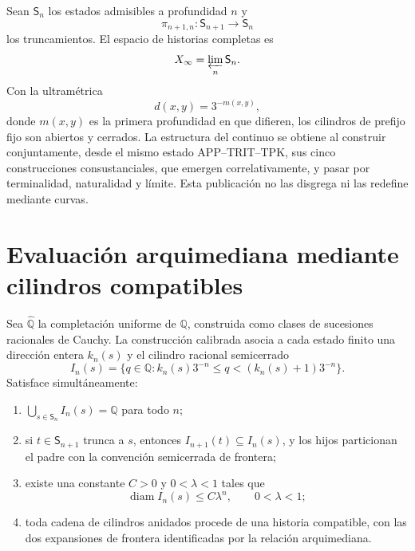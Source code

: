 Sean \(\mathsf S_n\) los estados admisibles a profundidad \(n\) y
\[
 \pi_{n+1,n}:\mathsf S_{n+1}\longrightarrow\mathsf S_n
\]
los truncamientos. El espacio de historias completas es
\[
 X_\infty=\varprojlim_n\mathsf S_n.
\]
Con la ultramétrica
\[
 d(x,y)=3^{-m(x,y)},
\]
donde \(m(x,y)\) es la primera profundidad en que difieren, los cilindros de
prefijo fijo son abiertos y cerrados. La estructura del continuo se obtiene
al construir conjuntamente, desde el mismo estado APP--TRIT--TPK, sus cinco
construcciones consustanciales, que emergen correlativamente, y pasar por terminalidad, naturalidad y
límite. Esta publicación no las disgrega ni las redefine mediante curvas.

\section{Evaluación arquimediana mediante cilindros compatibles}

Sea \(\widehat{\mathbb Q}\) la completación uniforme de \(\mathbb Q\), construida como
clases de sucesiones racionales de Cauchy. La construcción calibrada asocia
a cada estado finito una dirección entera \(k_n(s)\) y el cilindro racional
semicerrado
\[
 I_n(s)=\{q\in\mathbb Q:k_n(s)3^{-n}\le q<(k_n(s)+1)3^{-n}\}.
\]
Satisface simultáneamente:
\begin{enumerate}[label=\textup{(A\arabic*)}]
\item \(\bigcup_{s\in\mathsf S_n}I_n(s)=\mathbb Q\) para todo \(n\);
\item si \(t\in\mathsf S_{n+1}\) trunca a \(s\), entonces
      \(I_{n+1}(t)\subseteq I_n(s)\), y los hijos particionan el padre con
      la convención semicerrada de frontera;
\item existe una constante \(C>0\) y \(0<\lambda<1\) tales que
\[
 \operatorname{diam}I_n(s)\le C\lambda^n,
 \qquad 0<\lambda<1;
\]
\item toda cadena de cilindros anidados procede de una historia compatible,
      con las dos expansiones de frontera identificadas por la relación
      arquimediana.
\end{enumerate}

